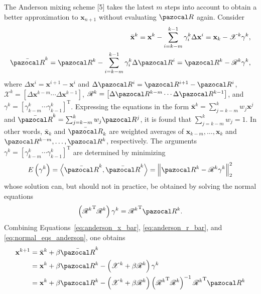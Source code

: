 The Anderson mixing scheme [5] takes the latest \(m\) steps into account to obtain a better approximation to \(\mathbf x_{n+1}\) without evaluating \(\pazocal R\) again.
Consider
\begin{align}
  \bar{\mathbf x}^{k}=\mathbf x^{k}-\sum_{i=k-m}^{k-1} \gamma_{i}^{k} \Delta \mathbf x^{i}=\mathbf x_{k}-\mathscr{X}^{k} \gamma^{k}, \label{eq:anderson_x_bar}\\
  \bar{\pazocal R}^{k}=\pazocal R^{k}-\sum_{i=k-m}^{k-1} \gamma_{i}^{k} \Delta \pazocal R^{i}=\pazocal R^{k}-\mathscr{R}^{k} \gamma^{k} \label{eq:anderson_r_bar},
\end{align}
where \(\Delta \mathbf x^{i}=\mathbf x^{i+1}-\mathbf x^{i}\) and \(\Delta \pazocal R^{i}=\pazocal R^{i+1}-\pazocal R^{i}\), \(\mathscr{X}^{k}=\left[\Delta \mathbf x^{k-m} \cdots \Delta \mathbf x^{k-1}\right]\), \(\mathscr{R}^{k}=\left[\Delta \pazocal R^{k-m} \cdots \Delta \pazocal R^{k-1}\right]\), and \(\gamma^{k}=\left[\gamma_{k-m}^{k} \cdots \gamma_{k-1}^{k}\right]^{\mathrm{T}}\).
Expressing the equations in the form \(\bar{\mathbf x}^{k}=\sum_{j=k-m}^{k} w_{j} \mathbf x^{j}\) and \(\bar{\pazocal R}^{k}=\sum_{j=k-m}^{k} w_{j} \pazocal R^{j}\), it is found that \(\sum_{j=k-m}^{k} w_{j}=1\).
In other words, \(\bar{\mathbf x}_{k}\) and \(\bar{\pazocal R}_{k}\) are weighted averages of \(\mathbf x_{k-m}, \ldots, \mathbf x_{k}\) and \(\pazocal R^{k-m}, \ldots, \pazocal R^{k}\), respectively.
The arguments \(\gamma^{k}=\left[\gamma_{k-m}^{k} \cdots \gamma_{k-1}^{k}\right]^{\mathrm{T}}\) are determined by minimizing
\begin{equation}
E\left(\gamma^{k}\right)=\left\langle\bar{\pazocal R}^{k}, \bar{\pazocal R}^{k}\right\rangle=\left\|\pazocal R^{k}-\mathscr{R}^{k} \gamma^{k}\right\|_{2}^{2}
\end{equation}
whose solution can, but should not in practice, be obtained by solving the normal equations
\begin{equation}
\left({\mathscr{R}^{k}}^{\mathrm{T}} \mathscr{R}^{k}\right) \gamma^{k}={\mathscr{R}^{k}}^{\mathrm{T}} \pazocal R^{k}. \label{eq:normal_eqs_anderson}
\end{equation}
Combining Equations~\eqref{eq:anderson_x_bar}, \eqref{eq:anderson_r_bar}, and \eqref{eq:normal_eqs_anderson}, one obtains
\begin{align}
\mathbf x^{k+1} &=\bar{\mathbf x}^{k}+\beta \bar{\pazocal R}^{k} \\
&=\mathbf x^{k}+\beta \pazocal R^{k}-\left(\mathscr{X}^{k}+\beta \mathscr{R}^{k}\right) \gamma^{k} \\
&=\mathbf x^{k}+\beta \pazocal R^{k}-\left(\mathscr{X}^{k}+\beta \mathscr{R}^{k}\right)\left({\mathscr{R}^{k}}^{\mathrm{T}} \mathscr{R}^{k}\right)^{-1} {\mathscr{R}^{k}}^{\mathrm{T}} \pazocal R^{k} \label{eq:update_anderson_mixing}
\end{align}
